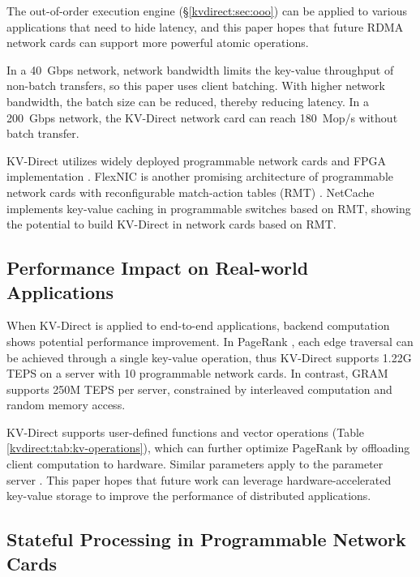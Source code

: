 The out-of-order execution engine (\S \ref {kvdirect:sec:ooo}) can be applied to various applications that need to hide latency, and this paper hopes that future RDMA network cards can support more powerful atomic operations.

In a 40~Gbps network, network bandwidth limits the key-value throughput of non-batch transfers, so this paper uses client batching. With higher network bandwidth, the batch size can be reduced, thereby reducing latency. In a 200~Gbps network, the KV-Direct network card can reach 180~Mop/s without batch transfer.

KV-Direct utilizes widely deployed programmable network cards and FPGA implementation \cite{putnam2014reconfigurable,caulfield2016cloud}. FlexNIC \cite {kaufmann2015flexnic,kaufmann2016krishnamurthy} is another promising architecture of programmable network cards with reconfigurable match-action tables (RMT) \cite {bosshart2013forwarding}.
NetCache \cite {netcache-sosp17} implements key-value caching in programmable switches based on RMT, showing the potential to build KV-Direct in network cards based on RMT.

\subsection{Performance Impact on Real-world Applications}

When KV-Direct is applied to end-to-end applications, backend computation shows potential performance improvement. In PageRank \cite{page1999pagerank}, each edge traversal can be achieved through a single key-value operation, thus KV-Direct supports 1.22G TEPS on a server with 10 programmable network cards. In contrast, GRAM \cite{wu2015g} supports 250M TEPS per server, constrained by interleaved computation and random memory access.

KV-Direct supports user-defined functions and vector operations (Table \ref{kvdirect:tab:kv-operations}), which can further optimize PageRank by offloading client computation to hardware. Similar parameters apply to the parameter server \cite{li2014scaling}. This paper hopes that future work can leverage hardware-accelerated key-value storage to improve the performance of distributed applications.

\subsection{Stateful Processing in Programmable Network Cards}
\label{kvdirect:sec:stateful-nic}

